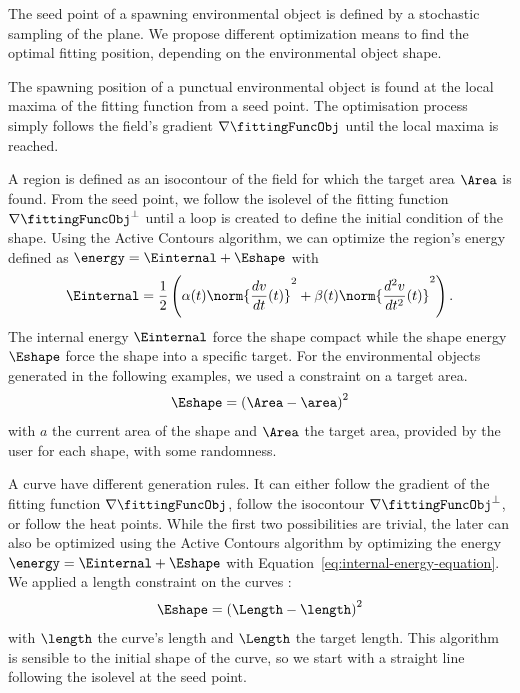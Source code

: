 The seed point of a spawning environmental object is defined by a stochastic sampling of the plane. We propose different optimization means to find the optimal fitting position, depending on the environmental object shape.

The spawning position of a punctual environmental object is found at the local maxima of the fitting function from a seed point. The optimisation process simply follows the field's gradient $\nabla \fittingFuncObj$ until the local maxima is reached.

A region is defined as an isocontour of the field for which the target area $\Area$ is found. From the seed point, we follow the isolevel of the fitting function $\nabla \fittingFuncObj^\perp$ until a loop is created to define the initial condition of the shape. Using the Active Contours algorithm, we can optimize the region's energy defined as $\energy = \Einternal + \Eshape$ with  
\begin{align}
    \label{eq:internal-energy-equation}
    \Einternal = \frac{1}{2} \left( \alpha(t) \norm{\frac{d v}{d t}(t)}^2 + \beta(t) \norm{\frac{d^2 v}{d t^2}(t)}^2  \right).
\end{align}
The internal energy $\Einternal$ force the shape compact while the shape energy $\Eshape$ force the shape into a specific target. For the environmental objects generated in the following examples, we used a constraint on a target area.
\begin{align}
    \label{eq:area-target-equation}
    \Eshape = \left( \Area - \area \right)^2
\end{align}
with $a$ the current area of the shape and $\Area$ the target area, provided by the user for each shape, with some randomness.

A curve have different generation rules. It can either follow the gradient of the fitting function $\nabla \fittingFuncObj$, follow the isocontour $\nabla \fittingFuncObj^\perp$, or follow the heat points.
While the first two possibilities are trivial, the later can also be optimized using the Active Contours algorithm by optimizing the energy $\energy = \Einternal + \Eshape$ with Equation~\eqref{eq:internal-energy-equation}. We applied a length constraint on the curves : 
\begin{align*}
    \Eshape = \left( \Length - \length \right)^2
\end{align*}
with $\length$ the curve's length and $\Length$ the target length. This algorithm is sensible to the initial shape of the curve, so we start with a straight line following the isolevel at the seed point.

